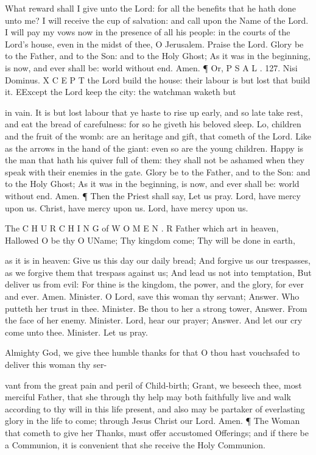 What reward shall I give unto the Lord: for all the benefits that he hath done unto me? I will receive the cup of salvation: and call upon the Name of the Lord. I will pay my vows now in the presence of all his people: in the courts of the Lord’s house, even in the midst of thee, O Jerusalem. Praise the Lord. Glory be to the Father, and to the Son: and to the Holy Ghost; As it was in the beginning, is now, and ever shall be: world without end. Amen. ¶ Or, P S A L . 127. Nisi Dominus. X C E P T the Lord build the house: their labour is but lost that build it. EExcept the Lord keep the city: the watchman waketh but

in vain. It is but lost labour that ye haste to rise up early, and so late take rest, and eat the bread of carefulness: for so he giveth his beloved sleep. Lo, children and the fruit of the womb: are an heritage and gift, that cometh of the Lord. Like as the arrows in the hand of the giant: even so are the young children. Happy is the man that hath his quiver full of them: they shall not be ashamed when they speak with their enemies in the gate. Glory be to the Father, and to the Son: and to the Holy Ghost; As it was in the beginning, is now, and ever shall be: world without end. Amen. ¶ Then the Priest shall say, Let us pray. Lord, have mercy upon us. Christ, have mercy upon us. Lord, have mercy upon us.

The C H U R C H I N G of W O M E N . R Father which art in heaven, Hallowed O be thy O UName; Thy kingdom come; Thy will be done in earth,

as it is in heaven: Give us this day our daily bread; And forgive us our trespasses, as we forgive them that trespass against us; And lead us not into temptation, But deliver us from evil: For thine is the kingdom, the power, and the glory, for ever and ever. Amen. Minister. O Lord, save this woman thy servant; Answer. Who putteth her trust in thee. Minister. Be thou to her a strong tower, Answer. From the face of her enemy. Minister. Lord, hear our prayer; Answer. And let our cry come unto thee. Minister. Let us pray.

Almighty God, we give thee humble thanks for that O thou hast vouchsafed to deliver this woman thy ser-

vant from the great pain and peril of Child-birth; Grant, we beseech thee, most merciful Father, that she through thy help may both faithfully live and walk according to thy will in this life present, and also may be partaker of everlasting glory in the life to come; through Jesus Christ our Lord. Amen. ¶ The Woman that cometh to give her Thanks, must offer accustomed Offerings; and if there be a Communion, it is convenient that she receive the Holy Communion.

